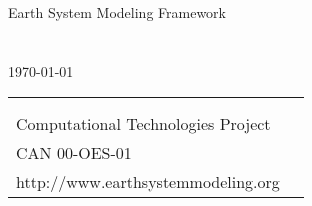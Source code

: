 %



\begin{titlepage}

\begin{center}
{\Large Earth System Modeling Framework } \\
\vspace{.25in}
{\Large {\bf \mytitle}} \\
\vspace{.75in}
{\large {\it \myauthors}} \\
\vspace{.25in}
{\large {\today}}
\vspace{.25in}
\end{center}

\begin{latexonly}
\vspace{4.5in}
\begin{tabular}{p{5in}p{.9in}}
\hrulefill \\
\noindent {\bf NASA Earth Science Technology Office} \\
\noindent Computational Technologies Project \\
\noindent CAN 00-OES-01 \\
\noindent http://www.earthsystemmodeling.org \\
\end{tabular}
\end{latexonly}

\end{titlepage}















